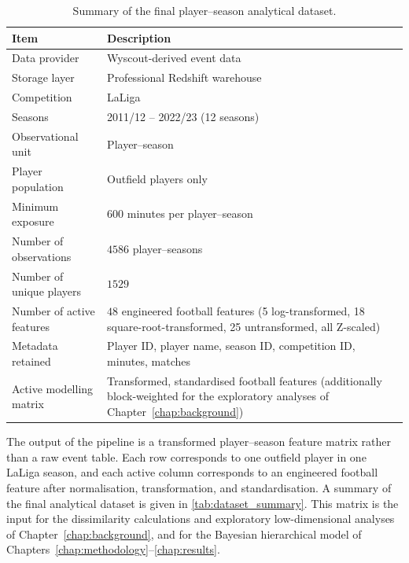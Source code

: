 \begin{table}[h]
\centering
\caption{Summary of the final player--season analytical dataset.}
\label{tab:dataset_summary}
\begin{tabularx}{\textwidth}{lX}
\toprule
Item & Description \\
\midrule
Data provider & Wyscout-derived event data \\
Storage layer & Professional Redshift warehouse \\
Competition & LaLiga \\
Seasons & 2011/12 -- 2022/23 (12 seasons) \\
Observational unit & Player--season \\
Player population & Outfield players only \\
Minimum exposure & 600 minutes per player--season \\
Number of observations & \(4586\) player--seasons \\
Number of unique players & \(1529\) \\
Number of active features & \(48\) engineered football features (5 log-transformed, 18 square-root-transformed, 25 untransformed, all Z-scaled) \\
Metadata retained & Player ID, player name, season ID, competition ID, minutes, matches \\
Active modelling matrix & Transformed, standardised football features (additionally block-weighted for the exploratory analyses of Chapter~\ref{chap:background}) \\
\bottomrule
\end{tabularx}
\end{table}

The output of the pipeline is a transformed player--season feature matrix rather than a raw event table. Each row corresponds to one outfield player in one LaLiga season, and each active column corresponds to an engineered football feature after normalisation, transformation, and standardisation. A summary of the final analytical dataset is given in \autoref{tab:dataset_summary}. This matrix is the input for the dissimilarity calculations and exploratory low-dimensional analyses of Chapter~\ref{chap:background}, and for the Bayesian hierarchical model of Chapters~\ref{chap:methodology}--\ref{chap:results}.